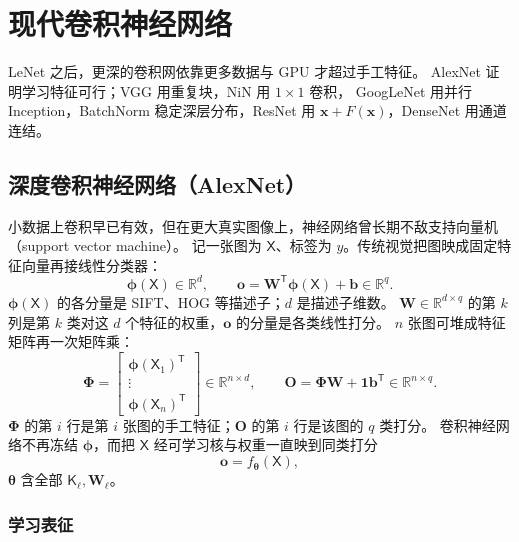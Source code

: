 \chapter{现代卷积神经网络}

LeNet 之后，更深的卷积网依靠更多数据与 GPU 才超过手工特征。
AlexNet 证明学习特征可行；VGG 用重复块，NiN 用 $1\times 1$ 卷积，
GoogLeNet 用并行 Inception，BatchNorm 稳定深层分布，ResNet 用 $\bm{x}+F(\bm{x})$，DenseNet 用通道连结。

\section{深度卷积神经网络（AlexNet）}




小数据上卷积早已有效，但在更大真实图像上，神经网络曾长期不敌支持向量机（support vector machine）。
记一张图为 $\mathsf{X}$、标签为 $y$。传统视觉把图映成固定特征向量再接线性分类器：
\[
\bm{\phi}(\mathsf{X})\in\mathbb{R}^{d},
\qquad
\bm{o}
=
\bm{W}^{\mathsf T}\bm{\phi}(\mathsf{X})+\bm{b}
\in\mathbb{R}^{q}.
\]
$\bm{\phi}(\mathsf{X})$ 的各分量是 SIFT、HOG 等描述子；$d$ 是描述子维数。
$\bm{W}\in\mathbb{R}^{d\times q}$ 的第 $k$ 列是第 $k$ 类对这 $d$ 个特征的权重，$\bm{o}$ 的分量是各类线性打分。
$n$ 张图可堆成特征矩阵再一次矩阵乘：
\[
\bm{\Phi}
=
\begin{bmatrix}
\bm{\phi}(\mathsf{X}_1)^{\mathsf T}\\
\vdots\\
\bm{\phi}(\mathsf{X}_n)^{\mathsf T}
\end{bmatrix}
\in\mathbb{R}^{n\times d},
\qquad
\bm{O}
=
\bm{\Phi}\bm{W}+\bm{1}\bm{b}^{\mathsf T}
\in\mathbb{R}^{n\times q}.
\]
$\bm{\Phi}$ 的第 $i$ 行是第 $i$ 张图的手工特征；$\bm{O}$ 的第 $i$ 行是该图的 $q$ 类打分。
卷积神经网络不再冻结 $\bm{\phi}$，而把 $\mathsf{X}$ 经可学习核与权重一直映到同类打分
\[
\bm{o}=f_{\bm{\theta}}(\mathsf{X}),
\]
$\bm{\theta}$ 含全部 $\mathsf{K}_\ell,\bm{W}_\ell$。

\subsection{学习表征}

